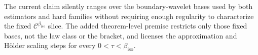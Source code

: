 The current claim silently ranges over the boundary-wavelet bases used by both estimators and hard families without requiring enough regularity to characterize the fixed \(\mathcal C^{\beta_{\mathrm{iso}}}\) slice. The added theorem-level premise restricts only those fixed bases, not the law class or the bracket, and licenses the approximation and H\"older scaling steps for every \(0<\tau<\beta_{\mathrm{iso}}\).